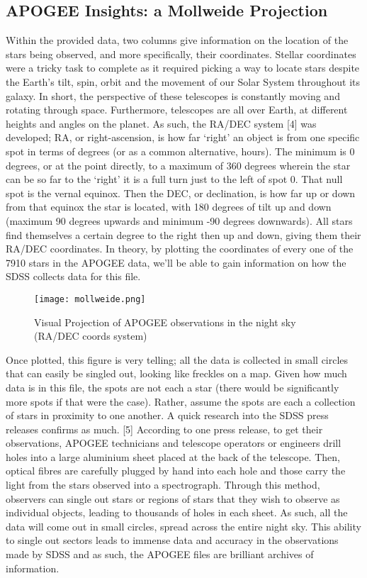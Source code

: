 \documentclass{article}
\begin{document}
\subsection*{APOGEE Insights: a Mollweide Projection}
\indent Within the provided data, two columns give information on the location of the stars being observed, and more specifically, their coordinates. Stellar coordinates were a tricky task to complete as it required picking a way to locate stars despite the Earth’s tilt, spin, orbit and the movement of our Solar System throughout its galaxy. In short, the perspective of these telescopes is constantly moving and rotating through space. Furthermore, telescopes are all over Earth, at different heights and angles on the planet. As such, the RA/DEC system [4] was developed; RA, or right-ascension, is how far ‘right’ an object is from one specific spot in terms of degrees (or as a common alternative, hours). The minimum is 0 degrees, or at the point directly, to a maximum of 360 degrees wherein the star can be so far to the ‘right’ it is a full turn just to the left of spot 0. That null spot is the vernal equinox. Then the DEC, or declination, is how far up or down from that equinox the star is located, with 180 degrees of tilt up and down (maximum 90 degrees upwards and minimum -90 degrees downwards). All stars find themselves a certain degree to the right then up and down, giving them their RA/DEC coordinates. In theory, by plotting the coordinates of every one of the 7910 stars in the APOGEE data, we’ll be able to gain information on how the SDSS collects data for this file. \\
\begin{figure}[H]
    \centering
    \texttt{[image: mollweide.png]}
    \caption{Visual Projection of APOGEE observations in the night sky (RA/DEC coords system)}
    \label{fig:4}
\end{figure}
\indent Once plotted, this figure is very telling; all the data is collected in small circles that can easily be singled out, looking like freckles on a map. Given how much data is in this file, the spots are not each a star (there would be significantly more spots if that were the case). Rather, assume the spots are each a collection of stars in proximity to one another. A quick research into the SDSS press releases confirms as much. [5] According to one press release, to get their observations, APOGEE technicians and telescope operators or engineers drill holes into a large aluminium sheet placed at the back of the telescope. Then, optical fibres are carefully plugged by hand into each hole and those carry the light from the stars observed into a spectrograph. Through this method, observers can single out stars or regions of stars that they wish to observe as individual objects, leading to thousands of holes in each sheet. As such, all the data will come out in small circles, spread across the entire night sky. This ability to single out sectors leads to immense data and accuracy in the observations made by SDSS and as such, the APOGEE files are brilliant archives of information. \\
\end{document}
